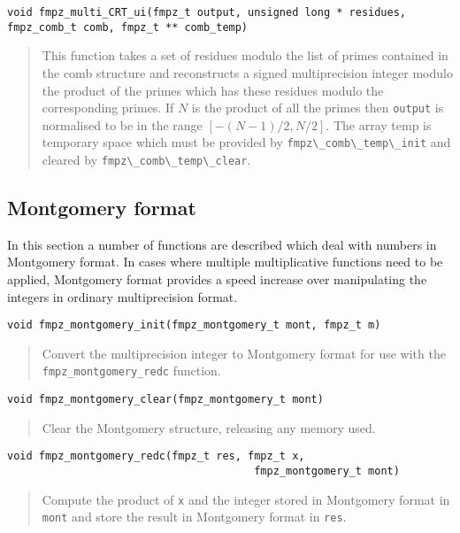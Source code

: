 \documentclass[a4paper,10pt]{article}
\newcommand{\code}{\lstinline}
\begin{document}
\begin{lstlisting}
void fmpz_multi_CRT_ui(fmpz_t output, unsigned long * residues, fmpz_comb_t comb, fmpz_t ** comb_temp)
\end{lstlisting}
\begin{quote}
This function takes a set of residues modulo the list of primes contained in the comb structure and reconstructs a signed multiprecision integer modulo the product of the primes which has these residues modulo the corresponding primes. If $N$ is the product of all the primes then \code{output} is normalised to be in the range $[-(N-1)/2, N/2]$. The array temp is temporary space which must be provided by \code{fmpz\_comb\_temp\_init} and cleared by \code{fmpz\_comb\_temp\_clear}.
\end{quote}

\subsection{Montgomery format}

In this section a number of functions are described which deal with numbers in Montgomery format. In cases where multiple multiplicative functions need to be applied, Montgomery format provides a speed increase over manipulating the integers in ordinary multiprecision format.

\begin{lstlisting}
void fmpz_montgomery_init(fmpz_montgomery_t mont, fmpz_t m) 
\end{lstlisting}
\begin{quote}
Convert the multiprecision integer to Montgomery format for use with the \code{fmpz_montgomery_redc} function.
\end{quote}

\begin{lstlisting}
void fmpz_montgomery_clear(fmpz_montgomery_t mont) 
\end{lstlisting}
\begin{quote}
Clear the Montgomery structure, releasing any memory used.
\end{quote}

\begin{lstlisting}
void fmpz_montgomery_redc(fmpz_t res, fmpz_t x, 
                                       fmpz_montgomery_t mont) 
\end{lstlisting}
\begin{quote}
Compute the product of \code{x} and the integer stored in Montgomery format in \code{mont} and store the result in Montgomery format in \code{res}.
\end{quote}
\end{document}
